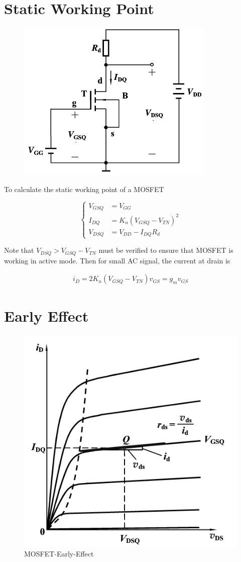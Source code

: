 \section{Static Working Point}

\begin{figure}[H]
  \centering
  \includegraphics[width=0.5\linewidth]{figures/MOSFET-Static}
  \label{fig:}
\end{figure}

To calculate the static working point of a MOSFET

\begin{equation*}
  \left\{
  \begin{aligned}
    V_{GSQ} &= V_{GG} \\
    I_{DQ} &= K_n \left( V_{GSQ} - V_{TN} \right)^2 \\
    V_{DSQ} &= V_{DD} - I_{DQ} R_d
  \end{aligned}
  \right.
\end{equation*}

Note that $V_{DSQ} > V_{GSQ} - V_{TN}$ must be verified to ensure that MOSFET is working in active mode. Then for small AC signal, the current at drain is

\begin{equation*}
  \begin{aligned}
    i_D = 2 K_n \left( V_{GSQ} - V_{TN} \right) v_{GS} = g_m v_{GS}
  \end{aligned}
\end{equation*}

\section{Early Effect}

\begin{figure}[H]
  \centering
  \includegraphics[width=0.3\linewidth]{figures/MOSFET-Early-Effect}
  \caption{MOSFET-Early-Effect}
  \label{fig:}
\end{figure}


